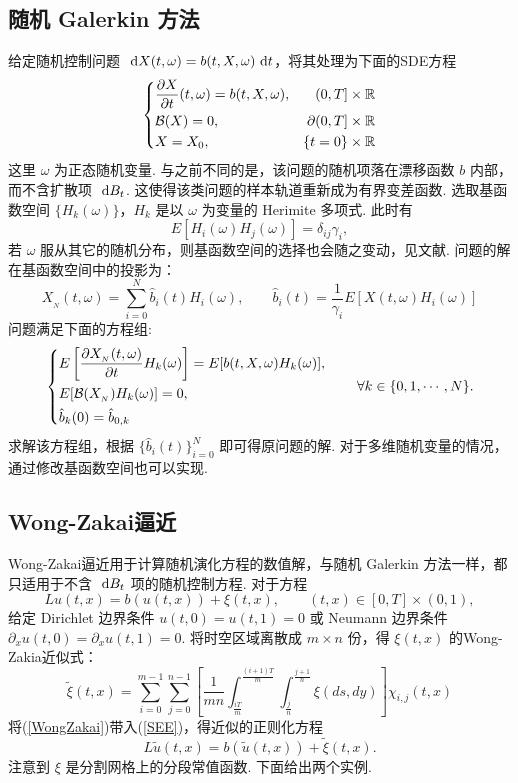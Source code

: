\subsection{随机 Galerkin 方法}
给定随机控制问题 $\text{ d} X(t,\omega)  = b(t,X,\omega) \text{ d} t$，将其处理为下面的SDE方程
\[
	\left\{
	\begin{aligned}
	&\frac{\partial X}{\partial t}(t,\omega) = b (t,X,\omega), &(0,T]\times \mathbb{R}    \\
	&\mathcal{B} (X)=0, &\partial(0,T]\times \mathbb{R}     \\
	&X=X_0, & \{t=0\} \times \mathbb{R}
	\end{aligned}
	\right.
\]
这里 $\omega$ 为正态随机变量. 
与之前不同的是，该问题的随机项落在漂移函数 $b$ 内部，而不含扩散项 $\text{ d} B_t$. 这使得该类问题的样本轨道重新成为有界变差函数. 
选取基函数空间 $\{ H_{k}(\omega) \}$，$H_k$ 是以 $\omega$ 为变量的 Herimite 多项式. 此时有
\[
	E[H_i(\omega) H_j(\omega)] = \delta_{ij} \gamma_i,
\]
若 $\omega$ 服从其它的随机分布，则基函数空间的选择也会随之变动，见文献\cite{book_buqueding}. 
问题的解在基函数空间中的投影为：
\[
	X_{_N}(t,\omega) = \sum_{i=0}^N \hat b_i(t) H_i (\omega),\qquad
	\hat b_i(t) = \frac1{\gamma_i} E[X(t,\omega)H_i(\omega)]
\]
问题满足下面的方程组:
\[
\left\{
\begin{aligned}
&E\left[\frac{\partial X_{_N}(t,\omega)}{\partial t} H_k(\omega)\right] = E[b(t,X,\omega) H_k(\omega)],\\
&E[\mathcal{B}(X_{_N}) H_k(\omega)] = 0,\\
&\hat b_k(0) = \hat b_{0,k}\\
\end{aligned}
\right.
\qquad \forall k \in \{0,1,\cdots,N\}.
\]
求解该方程组，根据 $\{\hat b_i(t)\}_{i=0}^N$ 即可得原问题的解. 对于多维随机变量的情况，通过修改基函数空间也可以实现. 
 
 
\subsection{Wong-Zakai逼近}
Wong-Zakai逼近用于计算随机演化方程的数值解，与随机 Galerkin 方法一样，都只适用于不含 $\text{ d} B_t$ 项的随机控制方程. 对于方程
\begin{equation}\label{SEE}
	L u(t,x) = b(u(t,x)) + \xi (t,x) ,\qquad (t,x) \in [0,T]\times (0,1),
\end{equation}
给定 Dirichlet 边界条件 $u(t,0) = u(t,1) = 0$ 或 Neumann 边界条件 $\partial_x u(t,0) = \partial_x u(t,1) = 0$. 将时空区域离散成 $m\times n$ 份，得 $\xi(t,x)$ 的Wong-Zakia近似式：
\begin{equation}\label{WongZakai}
	\tilde \xi (t,x)  =  \sum_{i=0}^{m-1} \sum_{j=0}^{n-1}\left[ \frac 1{mn}\int _ {\frac {iT}m}^{\frac{(i+1)T}m} \int_{\frac{j}{n}}^{\frac{j+1}n} \xi(ds,dy)\right] \chi_{i,j}(t,x)
\end{equation}
将(\ref{WongZakai})带入(\ref{SEE})，得近似的正则化方程
\begin{equation}\label{new_SEE}
	L \tilde{u}(t,x) = b(\tilde{u}(t,x)) + \tilde \xi (t,x). 
\end{equation}
注意到 $\xi$ 是分割网格上的分段常值函数. 下面给出两个实例.


